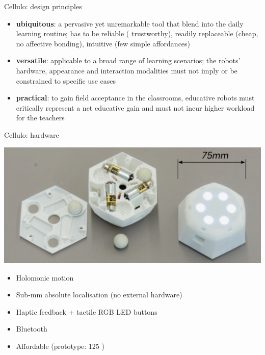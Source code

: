 \documentclass[compress]{beamer}
\begin{document}
{
 \begin{frame}{Cellulo: design principles}

     \begin{itemize}
         \item<1-> {\bf ubiquitous}: a pervasive yet unremarkable tool
             that blend into the daily learning routine; has to be reliable (\ie
             trustworthy), readily replaceable (\ie cheap, no affective bonding), intuitive (\ie few
             simple affordances)

         \item<2-> {\bf versatile}: applicable to a broad range of learning
             scenarios; the robots’ hardware, appearance and interaction
             modalities must not imply or be constrained to specific use cases

         \item<3-> {\bf practical}: to gain field
             acceptance in the classrooms, educative robots must critically
             represent a net educative gain and must not incur higher
             workload for the teachers
     \end{itemize}

 \end{frame}
}

 \begin{frame}{Cellulo: hardware}
     \begin{center}
         \includegraphics[width=0.8\linewidth]{cellulo/hardware-design}
     \end{center}
     \begin{itemize}
         \item Holomonic motion
         \item Sub-mm absolute localisation (no external hardware)
         \item Haptic feedback + tactile RGB LED buttons 
         \item Bluetooth
         \item<2> Affordable (prototype: 125 \EUR)
     \end{itemize}
 \end{frame}
\end{document}
